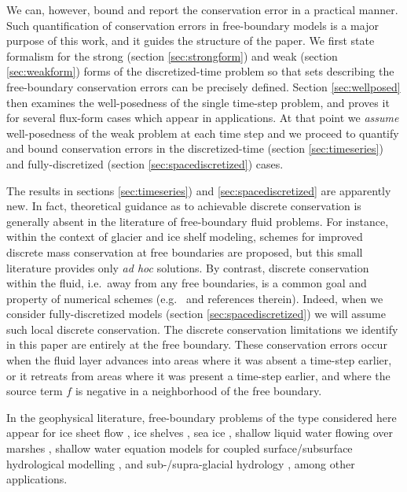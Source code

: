 \documentclass[final,leqno,onefignum,onetabnum]{siamltex1213bueler}
\begin{document}
We can, however, bound and report the conservation error in a practical manner.  Such quantification of conservation errors in free-boundary models is a major purpose of this work, and it guides the structure of the paper.  We first state formalism for the strong (section \ref{sec:strongform}) and weak (section \ref{sec:weakform}) forms of the discretized-time problem so that sets describing the free-boundary conservation errors can be precisely defined.  Section \ref{sec:wellposed} then examines the well-posedness of the single time-step problem, and proves it for several flux-form cases which appear in applications.  At that point we \emph{assume} well-posedness of the weak problem at each time step and we proceed to quantify and bound conservation errors in the discretized-time (section \ref{sec:timeseries}) and fully-discretized (section \ref{sec:spacediscretized}) cases.

The results in sections \ref{sec:timeseries}) and \ref{sec:spacediscretized} are apparently new.  In fact, theoretical guidance as to achievable discrete conservation is generally absent in the literature of free-boundary fluid problems.  For instance, within the context of glacier \cite{JaroschSchoofAnslow2013} and ice shelf \cite{Albrechtetal2011} modeling, schemes for improved discrete mass conservation at free boundaries are proposed, but this small literature provides only \emph{ad hoc} solutions.  By contrast, discrete conservation within the fluid, i.e.~away from any free boundaries, is a common goal and property of numerical schemes (e.g.~\cite{LeVeque2002} and references therein).  Indeed, when we consider fully-discretized models (section \ref{sec:spacediscretized}) we will assume such local discrete conservation.  The discrete conservation limitations we identify in this paper are entirely at the free boundary.  These conservation errors occur when the fluid layer advances into areas where it was absent a time-step earlier, or it retreats from areas where it was present a time-step earlier, and where the source term $f$ is negative in a neighborhood of the free boundary.

In the geophysical literature, free-boundary problems of the type considered here appear for ice sheet flow \cite{Bueler2015,Bueleretal2005,CalvoDuranyVazquez2000,Calvoetal2002,EgholmNielsen2010,JouvetBueler2012}, ice shelves \cite{Albrechtetal2011}, sea ice \cite[and references therein]{LipscombHunke2004}, shallow liquid water flowing over marshes \cite{AlonsoSantillanaDawson2008}, shallow water equation models for coupled surface/subsurface hydrological modelling \cite{Maxwelletal2014}, and sub-/supra-glacial hydrology \cite{Aschwandenetal2012,BuelervanPelt2015,Schoofetal2012}, among other applications.
\end{document}
